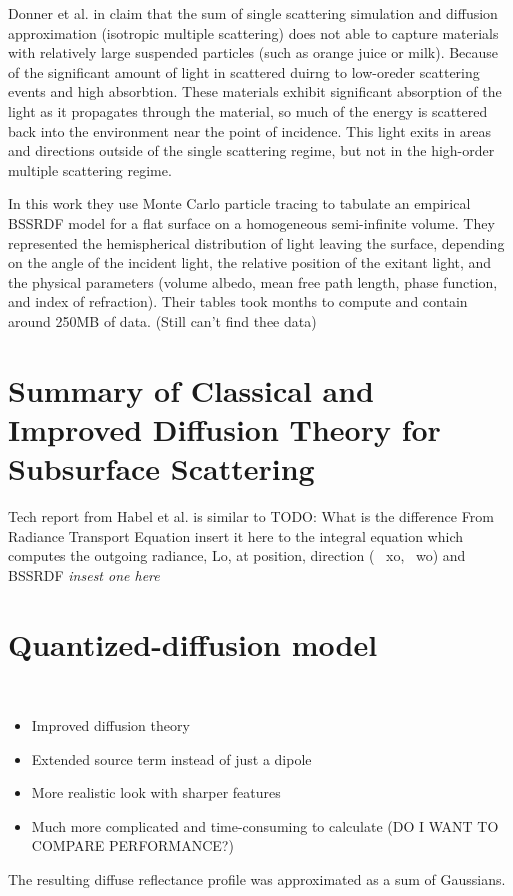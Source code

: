 Donner et al. in \cite{Donner:2009:EBM} claim that the sum of single scattering
simulation and diffusion approximation (isotropic multiple scattering) does not
able to capture materials with relatively large suspended particles (such as
orange juice or milk). Because of the significant amount of light in scattered
duirng to low-oreder scattering events and high absorbtion.
These materials exhibit significant absorption of the light as it propagates
through the material, so much of the energy is scattered back into
the environment near the point of incidence. This light exits in areas and
directions outside of the single scattering regime, but not in the high-order
multiple scattering regime.

In this work they use Monte Carlo particle tracing to tabulate an empirical
BSSRDF model for a flat surface on a homogeneous semi-infinite volume.
They represented the hemispherical distribution of light leaving the surface,
depending on the angle of the incident light, the relative position of the
exitant light, and the physical parameters (volume albedo, mean free path
length, phase function, and index of refraction). Their tables took months to
compute and contain around 250MB of data. (Still can't find thee data)

\section{Summary of \textbf{Classical and Improved Diffusion Theory for
Subsurface Scattering}}
Tech report from Habel et al. \cite{habel13cid} is similar to \cite{Habel:2013:PBD:2600890.2600896}
TODO: What is the difference
From Radiance Transport Equation {insert it here} to the integral equation which
computes the outgoing radiance, Lo, at position, direction (~ xo,~ wo) and
BSSRDF \textit{insest one here}


\section{Quantized-diffusion model}
\cite{D'Eon:2011:QMR:1964921.1964951}\\
\begin{itemize}
    \item Improved diffusion theory
    \item Extended source term instead of just a dipole
    \item More realistic look with sharper features
    \item Much more complicated and time-consuming to calculate (DO I WANT TO COMPARE PERFORMANCE?)
\end{itemize}
The resulting diffuse reflectance profile was approximated as a sum of Gaussians.

